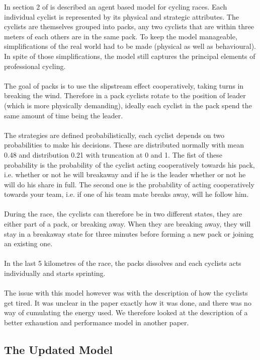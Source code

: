 \documentclass[10pt, a4paper]{report}
\begin{document}
In section 2 of \cite{AgentModel} is described an agent based model for cycling races. Each individual cyclist is represented by its physical and strategic attributes. The cyclists are themselves grouped into packs, any two cyclists that are within three meters of each others are in the same pack. To keep the model manageable, simplifications of the real world had to be made (physical as well as behavioural). In spite of those simplifications, the model still captures the principal elements of professional cycling. \\\\
The goal of packs is to use the slipstream effect cooperatively, taking turns in breaking the wind. Therefore in a pack cyclists rotate to the position of leader (which is more physically demanding), ideally each cyclist in the pack spend the same amount of time being the leader.\\\\
The strategies are defined probabilistically, each cyclist depends on two probabilities to make his decisions. These are distributed normally with mean 0.48 and distribution 0.21 with truncation at 0 and 1. The fist of these probability is the probability of the cyclist acting cooperatively towards his pack, i.e. whether or not he will breakaway and if he is the leader whether or not he will do his share in full. The second one is the probability of acting cooperatively towards your team, i.e. if one of his team mate breaks away, will he follow him. \\\\
During the race, the cyclists can therefore be in two different states, they are either part of a pack, or breaking away. When they are breaking away, they will stay in a breakaway state for three minutes before forming a new pack or joining an existing one.
\\\\
In the last 5 kilometres of the race, the packs dissolves and each cyclists acts individually and starts sprinting. \\\\
The issue with this model however was with the description of how the cyclists get tired. It was unclear in the paper exactly how it was done, and there was no way of cumulating the energy used. We therefore looked at the description of a better exhaustion and performance model in another paper.

\subsection{The Updated Model}\label{subsec:updmodel}
\end{document}
